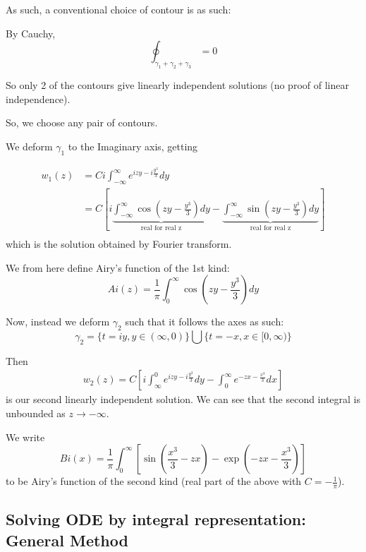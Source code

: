 \documentclass[a4paper]{article}
\begin{document}
\begin{eg}
	As such, a conventional choice of contour is as such:

\begin{figure}[ht]
    \centering
\end{figure}

By Cauchy,
\[
\oint_{\gamma_1 + \gamma_2 + \gamma_3} = 0 
\] 

So only 2 of the contours give linearly independent solutions (no proof of linear independence).

So, we choose any pair of contours.

We deform $\gamma_1$ to the Imaginary axis, getting

\begin{align*}
	 w_1(z) &= C  i\int_{-\infty}^{\infty} e^{izy - i \frac{y^3}{3}}dy \\
		&= C \left[ i \underbrace{\int_{-\infty}^{\infty} \cos\left( zy - \frac{y^3}{3} \right) dy}_{\text{real for real z}} - \underbrace{\int_{-\infty}^{\infty} \sin\left( zy - \frac{y^3}{3} \right) dy}_{\text{real for real z}} \right]  \\
 \end{align*} which is the solution obtained by Fourier transform.

We from here define Airy's function of the 1st kind:
\[
	Ai(z) = \frac{1}{\pi} \int_{0}^{\infty} \cos\left( zy - \frac{y^3}{3} \right) dy
\] 


Now, instead we deform $\gamma_2$ such that it follows the axes as such: 
\[
	\gamma_2 = \{t = iy, y \in (\infty, 0)\} \bigcup \{t = -x, x \in [0, \infty)\} 
\]

Then
\begin{align*}
	w_2(z) = C \left[ i \int_{\infty}^{0} e^{izy - i \frac{y^3}{3}}dy - \int_{0}^{\infty} e^{-zx - \frac{x^3}{3}} dx\right] 
\end{align*} is our second linearly independent solution. We can see that the second integral is unbounded as $z \to  -\infty$.

We write
\[
	Bi(x) = \frac{1}{\pi} \int_{0}^{\infty} \left[ \sin\left( \frac{x^3}{3} - zx \right) - \exp\left(-zx - \frac{x^3}{3} \right)  \right] 
\] to be Airy's function of the second kind (real part of the above with $C = -\frac{1}{\pi}$).
\end{eg}

\subsection{Solving ODE by integral representation: General Method}
\end{document}
